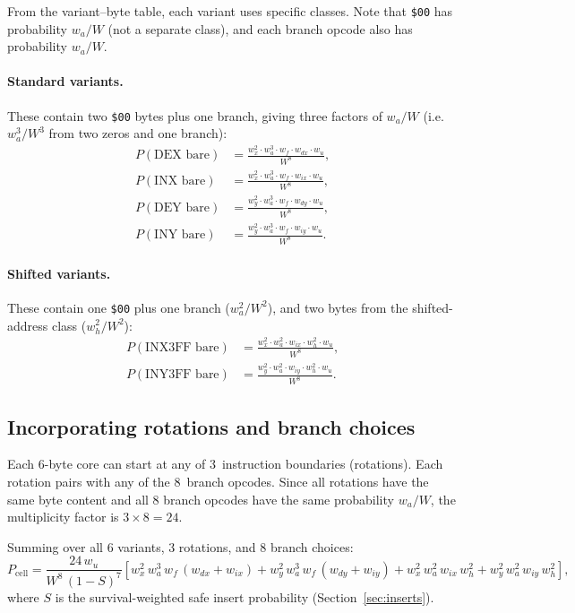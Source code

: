\documentclass{article}
\newcommand{\hex}[1]{\texttt{\$#1}}
\newcommand{\wa}{w_a}
\newcommand{\wf}{w_f}
\newcommand{\wx}{w_x}
\newcommand{\wy}{w_y}
\newcommand{\wix}{w_{ix}}
\newcommand{\wiy}{w_{iy}}
\newcommand{\wdx}{w_{dx}}
\newcommand{\wdy}{w_{dy}}
\newcommand{\wh}{w_h}
\newcommand{\wu}{w_u}
\begin{document}
From the variant--byte table, each variant uses specific classes.
Note that \hex{00} has probability $\wa/W$ (not a separate class),
and each branch opcode also has probability $\wa/W$.

\paragraph{Standard variants.}
These contain two \hex{00} bytes plus one branch, giving three
factors of $\wa/W$ (i.e.\ $\wa^3/W^3$ from two zeros and one
branch):
\begin{align}
P(\text{DEX bare}) &= \frac{\wx^2 \cdot \wa^3 \cdot \wf \cdot \wdx \cdot \wu}{W^8},
\label{eq:pdex} \\
P(\text{INX bare}) &= \frac{\wx^2 \cdot \wa^3 \cdot \wf \cdot \wix \cdot \wu}{W^8},
\label{eq:pinx} \\
P(\text{DEY bare}) &= \frac{\wy^2 \cdot \wa^3 \cdot \wf \cdot \wdy \cdot \wu}{W^8},
\label{eq:pdey} \\
P(\text{INY bare}) &= \frac{\wy^2 \cdot \wa^3 \cdot \wf \cdot \wiy \cdot \wu}{W^8}.
\label{eq:piny}
\end{align}

\paragraph{Shifted variants.}
These contain one \hex{00} plus one branch ($\wa^2/W^2$), and two
bytes from the shifted-address class ($\wh^2/W^2$):
\begin{align}
P(\text{INX3FF bare}) &= \frac{\wx^2 \cdot \wa^2 \cdot \wix \cdot \wh^2 \cdot \wu}{W^8},
\label{eq:pinx3ff} \\
P(\text{INY3FF bare}) &= \frac{\wy^2 \cdot \wa^2 \cdot \wiy \cdot \wh^2 \cdot \wu}{W^8}.
\label{eq:piny3ff}
\end{align}

\subsection{Incorporating rotations and branch choices}

Each 6-byte core can start at any of 3~instruction boundaries
(rotations).  Each rotation pairs with any of the 8~branch opcodes.
Since all rotations have the same byte content and all 8 branch
opcodes have the same probability $\wa/W$, the multiplicity factor
is $3 \times 8 = 24$.

Summing over all 6 variants, 3 rotations, and 8 branch choices:
\begin{equation}
\boxed{
P_{\text{cell}} = \frac{24\,\wu}{W^8\,(1-S)^7}
  \left[
    \wx^2\,\wa^3\,\wf\,(\wdx + \wix)
  + \wy^2\,\wa^3\,\wf\,(\wdy + \wiy)
  + \wx^2\,\wa^2\,\wix\,\wh^2
  + \wy^2\,\wa^2\,\wiy\,\wh^2
  \right],
}
\label{eq:pcell}
\end{equation}
where $S$ is the survival-weighted safe insert probability
(Section~\ref{sec:inserts}).
\end{document}
